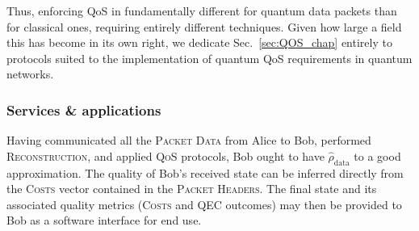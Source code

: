 Thus, enforcing QoS in fundamentally different for quantum data packets than for classical ones, requiring entirely different techniques. Given how large a field this has become in its own right, we dedicate Sec.~\ref{sec:QOS_chap} entirely to protocols suited to the implementation of quantum QoS requirements in quantum networks.

%
%

\subsubsection{Services \& applications}  \label{sec:services_apps}

Having communicated all the \textsc{Packet Data} from Alice to Bob, performed \textsc{Reconstruction}, and applied \textsc{QoS} protocols, Bob ought to have $\hat\rho_\mathrm{data}$ to a good approximation. The quality of Bob's received state can be inferred directly from the \textsc{Costs} vector contained in the \textsc{Packet Headers}. The final state and its associated quality metrics (\textsc{Costs} and QEC outcomes) may then be provided to Bob as a software interface for end use.